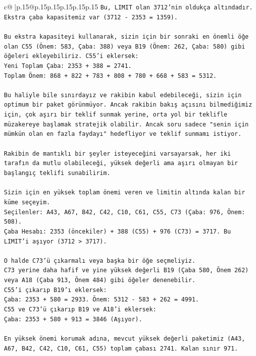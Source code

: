 \documentclass{article}
\begin{document}
{\begin{supertabular}{c@{$\;$}|p{.15\linewidth}@{}p{.15\linewidth}p{.15\linewidth}p{.15\linewidth}p{.15\linewidth}p{.15\linewidth}}
{{{\texttt{Bu, LIMIT olan 3712'nin oldukça altındadır. Ekstra çaba kapasitemiz var (3712 {-} 2353 = 1359).} \\
\\ 
\texttt{Bu ekstra kapasiteyi kullanarak, sizin için bir sonraki en önemli öğe olan C55 (Önem: 583, Çaba: 388) veya B19 (Önem: 262, Çaba: 580) gibi öğeleri ekleyebiliriz. C55'i eklersek:} \\
\texttt{Yeni Toplam Çaba: 2353 + 388 = 2741.} \\
\texttt{Toplam Önem: 868 + 822 + 783 + 808 + 780 + 668 + 583 = 5312.} \\
\\ 
\texttt{Bu haliyle bile sınırdayız ve rakibin kabul edebileceği, sizin için optimum bir paket görünmüyor. Ancak rakibin bakış açısını bilmediğimiz için, çok aşırı bir teklif sunmak yerine, orta yol bir teklifle müzakereye başlamak stratejik olabilir. Ancak soru sadece "senin için mümkün olan en fazla faydayı" hedefliyor ve teklif sunmamı istiyor.} \\
\\ 
\texttt{Rakibin de mantıklı bir şeyler isteyeceğini varsayarsak, her iki tarafın da mutlu olabileceği, yüksek değerli ama aşırı olmayan bir başlangıç teklifi sunabilirim.} \\
\\ 
\texttt{Sizin için en yüksek toplam önemi veren ve limitin altında kalan bir küme seçeyim.} \\
\texttt{Seçilenler: A43, A67, B42, C42, C10, C61, C55, C73 (Çaba: 976, Önem: 508).} \\
\texttt{Çaba Hesabı: 2353 (öncekiler) + 388 (C55) + 976 (C73) = 3717. Bu LIMIT'i aşıyor (3712 > 3717).} \\
\\ 
\texttt{O halde C73'ü çıkarmalı veya başka bir öğe seçmeliyiz.} \\
\texttt{C73 yerine daha hafif ve yine yüksek değerli B19 (Çaba 580, Önem 262) veya A18 (Çaba 913, Önem 484) gibi öğeler denenebilir.} \\
\texttt{C55'i çıkarıp B19'ı eklersek:} \\
\texttt{Çaba: 2353 + 580 = 2933. Önem: 5312 {-} 583 + 262 = 4991.} \\
\texttt{C55 ve C73'ü çıkarıp B19 ve A18'i eklersek:} \\
\texttt{Çaba: 2353 + 580 + 913 = 3846 (Aşıyor).} \\
\\ 
\texttt{En yüksek önemi korumak adına, mevcut yüksek değerli paketimiz (A43, A67, B42, C42, C10, C61, C55) toplam çabası 2741. Kalan sınır 971.} \\
}}}
\end{supertabular}}
\end{document}
